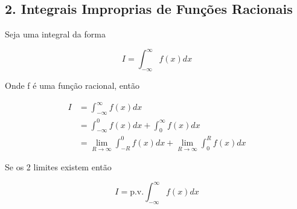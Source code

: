 \documentclass{article}
\begin{document}
\subsection*{2. Integrais Improprias de Funções Racionais}
Seja uma integral da forma

\begin{equation*}
    I = \int_{-\infty}^\infty f(x) d x
\end{equation*}

Onde f é uma função racional, então

\begin{align*}
    I &= \int_{-\infty}^\infty f(x) d x \\
    &= \int_{- \infty}^0 f(x) d x + \int_0^\infty f(x) d x \\
    &= \lim_{R \to \infty} \int_{- R}^0 f(x) d x + \lim_{R \to \infty} \int_0^R f(x) d x 
\end{align*}

Se os 2 limites existem então

\begin{equation*}
    I = \mathrm{p.v.} \int_{- \infty}^\infty f(x) d x
\end{equation*}
\end{document}
